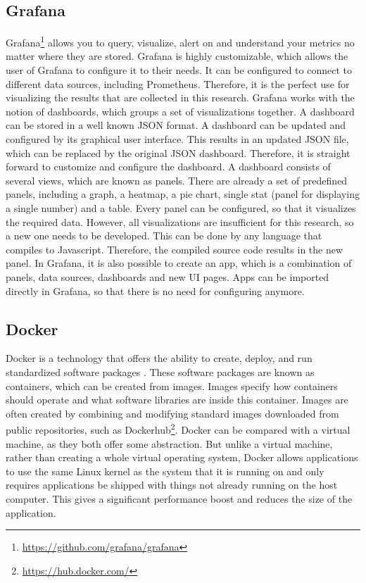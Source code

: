 \subsection{Grafana}
Grafana\footnote{\url{https://github.com/grafana/grafana}} allows you to query, visualize, alert on and understand your metrics no matter where they are stored. Grafana is highly customizable, which allows the user of Grafana to configure it to their needs. It can be configured to connect to different data sources, including Prometheus. Therefore, it is the perfect use for visualizing the results that are collected in this research. Grafana works with the notion of dashboards, which groups a set of visualizations together. A dashboard can be stored in a well known JSON format. A dashboard can be updated and configured by its graphical user interface. This results in an updated JSON file, which can be replaced by the original JSON dashboard. Therefore, it is straight forward to customize and configure the dashboard. A dashboard consists of several views, which are known as panels. There are already a set of predefined panels, including a graph, a heatmap, a pie chart, single stat (panel for displaying a single number) and a table. Every panel can be configured, so that it visualizes the required data. However, all visualizations are insufficient for this research, so a new one needs to be developed. This can be done by any language that compiles to Javascript. Therefore, the compiled source code results in the new panel. In Grafana, it is also possible to create an app, which is a combination of panels, data sources, dashboards and new UI pages. Apps can be imported directly in Grafana, so that there is no need for configuring anymore. 

\subsection{Docker} \label{sec:docker}
Docker is a technology that offers the ability to create, deploy, and run standardized software packages \cite{docker}. These software packages are known as containers, which can be created from images. Images specify how containers should operate and what software libraries are inside this container. Images are often created by combining and modifying standard images downloaded from public repositories, such as Dockerhub\footnote{\url{https://hub.docker.com/}}. Docker can be compared with a virtual machine, as they both offer some abstraction.  But unlike a virtual machine, rather than creating a whole virtual operating system, Docker allows applications to use the same Linux kernel as the system that it is running on and only requires applications be shipped with things not already running on the host computer. This gives a significant performance boost and reduces the size of the application.

